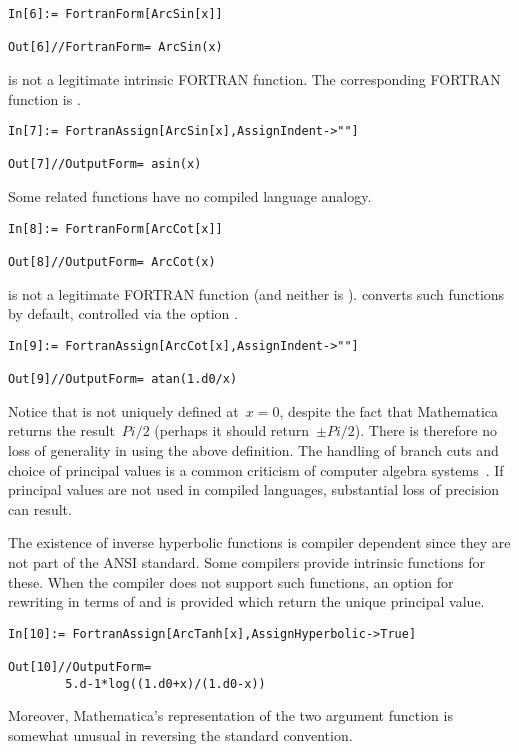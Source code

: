 \documentclass [12pt,twoside]{article}
\begin{document}
\begin{verbatim}
In[6]:= FortranForm[ArcSin[x]]

Out[6]//FortranForm= ArcSin(x)
\end{verbatim}
 is not a legitimate intrinsic FORTRAN function. The corresponding
FORTRAN function is .

\begin{verbatim}
In[7]:= FortranAssign[ArcSin[x],AssignIndent->""]

Out[7]//OutputForm= asin(x)
\end{verbatim}
Some related functions have no compiled language analogy.

\begin{verbatim}
In[8]:= FortranForm[ArcCot[x]]

Out[8]//OutputForm= ArcCot(x)
\end{verbatim}
 is not a legitimate FORTRAN function (and neither is ).
 converts such functions by default, controlled via the option
.

\begin{verbatim}
In[9]:= FortranAssign[ArcCot[x],AssignIndent->""]

Out[9]//OutputForm= atan(1.d0/x)
\end{verbatim}
Notice that  is not uniquely defined at~$x=0$, despite the fact
that Mathematica returns the result~$Pi/2$ (perhaps it should return~$\pm
Pi/2$). There is therefore no loss of generality in using the above definition.
The handling of branch cuts and choice of principal values is a common criticism
of computer algebra systems~\cite{stout-91}. If principal values are not used in
compiled languages, substantial loss of precision can result.

The existence of inverse hyperbolic functions is compiler dependent
since they are not part of the ANSI standard. Some compilers provide
intrinsic functions for these. When the compiler does not support such
functions, an option for rewriting in terms of
 and  is provided which return the unique principal value.

\begin{verbatim}
In[10]:= FortranAssign[ArcTanh[x],AssignHyperbolic->True]

Out[10]//OutputForm=
        5.d-1*log((1.d0+x)/(1.d0-x))
\end{verbatim}
Moreover, Mathematica's representation of the two argument function  is
somewhat unusual in reversing the standard convention.
\end{document}

